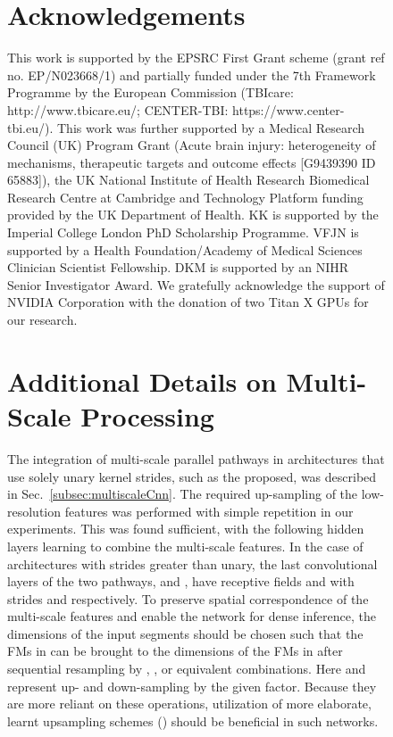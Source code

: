 \documentclass[preprint,authoryear,12pt]{elsarticle}
\begin{document}
\begin{figure}[h]
\section*{Acknowledgements}

This work is supported by the EPSRC First Grant scheme (grant ref no. EP/N023668/1) and partially funded under the 7th Framework Programme by the European Commission (TBIcare: http://www.tbicare.eu/; CENTER-TBI: https://www.center-tbi.eu/).
This work was further supported by a Medical Research Council (UK) Program Grant (Acute brain injury: heterogeneity of mechanisms, therapeutic targets and outcome effects [G9439390 ID 65883]), the UK National Institute of Health Research Biomedical Research Centre at Cambridge and Technology Platform funding provided by the UK Department of Health. KK is supported by the Imperial College London PhD Scholarship Programme. VFJN is supported by a Health Foundation/Academy of Medical Sciences Clinician Scientist Fellowship. DKM is supported by an NIHR Senior Investigator Award. We gratefully acknowledge the support of NVIDIA Corporation with the donation of two Titan X GPUs for our research.
 


\appendix



\section{Additional Details on Multi-Scale Processing}
\label{app:detailsMultiscale}

The integration of multi-scale parallel pathways in architectures that use solely unary kernel strides, such as the proposed, was described in Sec.~\ref{subsec:multiscaleCnn}. The required up-sampling of the low-resolution features was performed with simple repetition in our experiments. This was found sufficient, with the following hidden layers learning to combine the multi-scale features. In the case of architectures with strides greater than unary, the last convolutional layers of the two pathways,  and , have receptive fields  and  with strides  and  respectively. To preserve spatial correspondence of the multi-scale features and enable the network for dense inference, the dimensions of the input segments should be chosen such that the FMs in  can be brought to the dimensions of the FMs in  after sequential resampling by , ,  or equivalent combinations. Here  and  represent up- and down-sampling by the given factor. Because they are more reliant on these operations, utilization of more elaborate, learnt upsampling schemes (\cite{Long2014, Ronneberger2015, Noh2015}) should be beneficial in such networks.



\end{figure}
\end{document}
